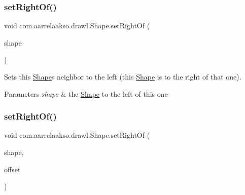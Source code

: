 \subsubsection{\texorpdfstring{set\+Right\+Of()}{setRightOf()}\hspace{0.1cm}{\footnotesize\ttfamily [1/2]}}
{\footnotesize\ttfamily void com.\+aarrelaakso.\+drawl.\+Shape.\+set\+Right\+Of (\begin{DoxyParamCaption}\item[{@Not\+Null \hyperlink{classcom_1_1aarrelaakso_1_1drawl_1_1_shape}{Shape}}]{shape }\end{DoxyParamCaption})\hspace{0.3cm}{\ttfamily [inherited]}}



Sets this \hyperlink{classcom_1_1aarrelaakso_1_1drawl_1_1_shape}{Shape}\textquotesingle{}s neighbor to the left (this \hyperlink{classcom_1_1aarrelaakso_1_1drawl_1_1_shape}{Shape} is to the right of that one). 


\begin{DoxyParams}{Parameters}
{\em shape} & the \hyperlink{classcom_1_1aarrelaakso_1_1drawl_1_1_shape}{Shape} to the left of this one \\
\hline
\end{DoxyParams}
\mbox{\label{classcom_1_1aarrelaakso_1_1drawl_1_1_shape_a6be6bb2859ccc4fd6e55e85aac5ec255}} 
\subsubsection{\texorpdfstring{set\+Right\+Of()}{setRightOf()}\hspace{0.1cm}{\footnotesize\ttfamily [2/2]}}
{\footnotesize\ttfamily void com.\+aarrelaakso.\+drawl.\+Shape.\+set\+Right\+Of (\begin{DoxyParamCaption}\item[{@Not\+Null \hyperlink{classcom_1_1aarrelaakso_1_1drawl_1_1_shape}{Shape}}]{shape,  }\item[{@Not\+Null \hyperlink{classcom_1_1aarrelaakso_1_1drawl_1_1_measure}{Measure}}]{offset }\end{DoxyParamCaption})\hspace{0.3cm}{\ttfamily [inherited]}}



